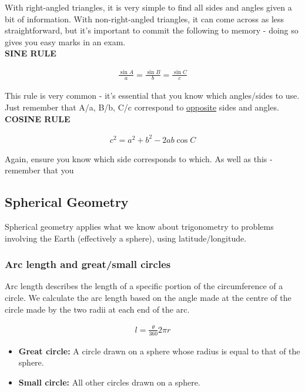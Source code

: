 \documentclass{article}
\begin{document}
With right-angled triangles, it is very simple to find all sides and angles given a bit of information. With non-right-angled triangles, it can come across as less straightforward, but it's important to commit the following to memory - doing so gives you easy marks in an exam. \\

\textbf{SINE RULE}

\begin{align*}
\frac{\sin A}{a} = \frac{\sin B}{b} = \frac{\sin C}{c} 
\end{align*}

This rule is very common - it's essential that you know which angles/sides to use. Just remember that A/a, B/b, C/c correspond to \underline{opposite} sides and angles. \\

\textbf{COSINE RULE}

\begin{align*}
c^2 = a^2 + b^2 -2ab\cos C
\end{align*}

Again, ensure you know which side corresponds to which. As well as this - remember that you

\subsection{Spherical Geometry}

Spherical geometry applies what we know about trigonometry to problems involving the Earth (effectively a sphere), using latitude/longitude. 

\subsubsection{Arc length and great/small circles}

Arc length describes the length of a specific portion of the circumference of a circle. We calculate the arc length based on the angle made at the centre of the circle made by the two radii at each end of the arc.

\begin{align*}
l = \frac{\theta}{360}2 \pi r 
\end{align*}

\begin{itemize}
	\item \textbf{Great circle:} A circle drawn on a sphere whose radius is equal to that of the sphere. 
	\item \textbf{Small circle:} All other circles drawn on a sphere. 
\end{itemize}
\end{document}
